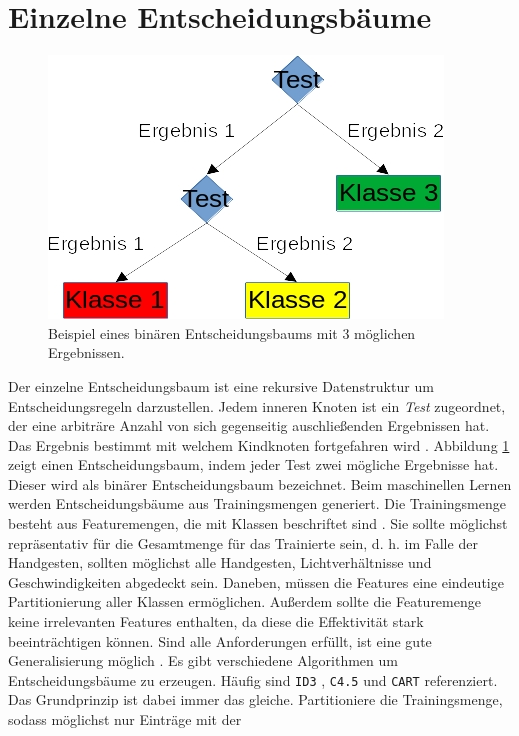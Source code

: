 \section{Einzelne Entscheidungsbäume}
\label{sec:construction}
\begin{figure}
    \centering
    \includegraphics[width=0.5\linewidth]{images/entscheidungsbaum.jpg}
    \caption{Beispiel eines binären Entscheidungsbaums mit 3 möglichen Ergebnissen.}
    \label{fig:entscheidungsbaum}
\end{figure}
Der einzelne Entscheidungsbaum ist eine rekursive Datenstruktur um Entscheidungsregeln darzustellen. Jedem inneren Knoten ist ein \textit{Test} zugeordnet, der eine arbiträre Anzahl von sich gegenseitig
auschließenden Ergebnissen hat. Das Ergebnis bestimmt mit welchem Kindknoten fortgefahren wird \cite{quinlan1990decision}. Abbildung \ref{fig:entscheidungsbaum} zeigt einen Entscheidungsbaum, indem jeder Test
zwei mögliche Ergebnisse hat. Dieser wird als binärer Entscheidungsbaum bezeichnet.
\newline
\newline
Beim maschinellen Lernen werden Entscheidungsbäume aus Trainingsmengen generiert. Die Trainingsmenge besteht aus Featuremengen, die mit Klassen beschriftet sind \cite{steinbergCART}. Sie sollte möglichst repräsentativ
für die Gesamtmenge für das Trainierte sein, d. h. im Falle der Handgesten, sollten möglichst alle Handgesten, Lichtverhältnisse und Geschwindigkeiten abgedeckt sein. Daneben, müssen die Features eine eindeutige
Partitionierung aller Klassen ermöglichen. Außerdem sollte die Featuremenge keine irrelevanten Features enthalten, da diese die Effektivität stark beeinträchtigen können. Sind alle Anforderungen erfüllt, ist eine 
gute Generalisierung möglich \cite{pei1998feature}.
\newline
\newline
Es gibt verschiedene Algorithmen um Entscheidungsbäume zu erzeugen. Häufig sind \texttt{ID3} \cite{quinlan1986induction}, \texttt{C4.5} \cite{quinlan2014c4}
und \texttt{CART} \cite{breiman1984classification} referenziert. Das Grundprinzip ist dabei immer das gleiche. Partitioniere die Trainingsmenge, sodass möglichst nur Einträge mit der
